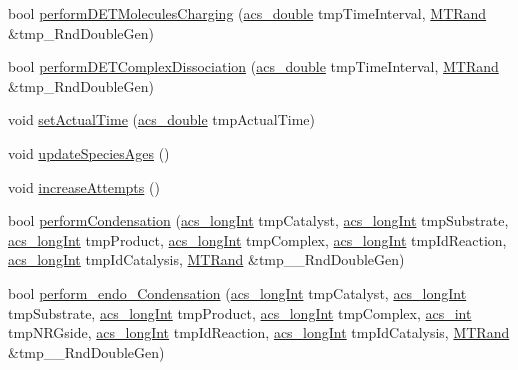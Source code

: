 \begin{DoxyCompactItemize}
\item 
bool \hyperlink{a00013_adbaf165a12edd62c614a455544807ea3}{perform\+D\+E\+T\+Molecules\+Charging} (\hyperlink{a00050_ab776853a005fcbf56af0424a2a4dd607}{acs\+\_\+double} tmp\+Time\+Interval, \hyperlink{a00015}{M\+T\+Rand} \&tmp\+\_\+\+Rnd\+Double\+Gen)
\item 
bool \hyperlink{a00013_a6ae793f9d2dca0632239be955dd83cee}{perform\+D\+E\+T\+Complex\+Dissociation} (\hyperlink{a00050_ab776853a005fcbf56af0424a2a4dd607}{acs\+\_\+double} tmp\+Time\+Interval, \hyperlink{a00015}{M\+T\+Rand} \&tmp\+\_\+\+Rnd\+Double\+Gen)
\item 
void \hyperlink{a00013_a9bc445da3e89d09d4fce11c83f3dedb0}{set\+Actual\+Time} (\hyperlink{a00050_ab776853a005fcbf56af0424a2a4dd607}{acs\+\_\+double} tmp\+Actual\+Time)
\item 
void \hyperlink{a00013_adab0607255ca5927b69cb6882917e031}{update\+Species\+Ages} ()
\item 
void \hyperlink{a00013_aac3eed768b89e3a70017075b68046ede}{increase\+Attempts} ()
\item 
bool \hyperlink{a00013_a1baf5512b7e0a8fb6f8f890ba9f99cd1}{perform\+Condensation} (\hyperlink{a00050_a19319d75f02db4308bc5c0026d98cd85}{acs\+\_\+long\+Int} tmp\+Catalyst, \hyperlink{a00050_a19319d75f02db4308bc5c0026d98cd85}{acs\+\_\+long\+Int} tmp\+Substrate, \hyperlink{a00050_a19319d75f02db4308bc5c0026d98cd85}{acs\+\_\+long\+Int} tmp\+Product, \hyperlink{a00050_a19319d75f02db4308bc5c0026d98cd85}{acs\+\_\+long\+Int} tmp\+Complex, \hyperlink{a00050_a19319d75f02db4308bc5c0026d98cd85}{acs\+\_\+long\+Int} tmp\+Id\+Reaction, \hyperlink{a00050_a19319d75f02db4308bc5c0026d98cd85}{acs\+\_\+long\+Int} tmp\+Id\+Catalysis, \hyperlink{a00015}{M\+T\+Rand} \&tmp\+\_\+\+\_\+\+Rnd\+Double\+Gen)
\item 
bool \hyperlink{a00013_aa7a2cc95d8ba242c805a8fda063b23a7}{perform\+\_\+endo\+\_\+\+Condensation} (\hyperlink{a00050_a19319d75f02db4308bc5c0026d98cd85}{acs\+\_\+long\+Int} tmp\+Catalyst, \hyperlink{a00050_a19319d75f02db4308bc5c0026d98cd85}{acs\+\_\+long\+Int} tmp\+Substrate, \hyperlink{a00050_a19319d75f02db4308bc5c0026d98cd85}{acs\+\_\+long\+Int} tmp\+Product, \hyperlink{a00050_a19319d75f02db4308bc5c0026d98cd85}{acs\+\_\+long\+Int} tmp\+Complex, \hyperlink{a00050_a8d277355641a098190360234e2ebde35}{acs\+\_\+int} tmp\+N\+R\+Gside, \hyperlink{a00050_a19319d75f02db4308bc5c0026d98cd85}{acs\+\_\+long\+Int} tmp\+Id\+Reaction, \hyperlink{a00050_a19319d75f02db4308bc5c0026d98cd85}{acs\+\_\+long\+Int} tmp\+Id\+Catalysis, \hyperlink{a00015}{M\+T\+Rand} \&tmp\+\_\+\+\_\+\+Rnd\+Double\+Gen)

\end{DoxyCompactItemize}
